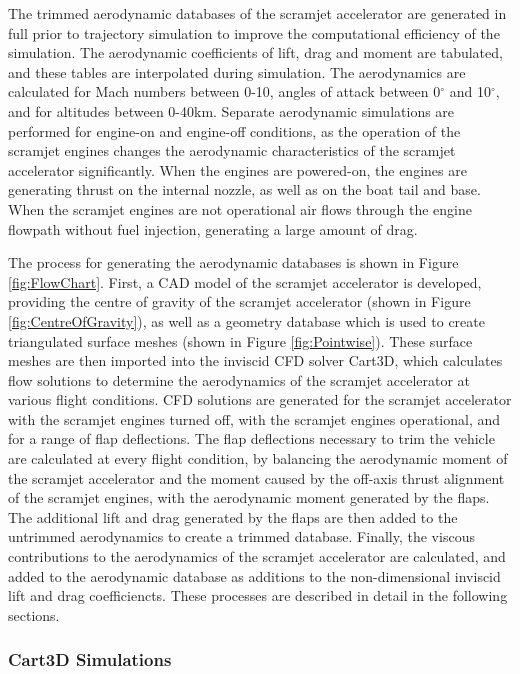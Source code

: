 The trimmed aerodynamic databases of the scramjet accelerator are generated in full prior to trajectory simulation to improve the computational efficiency of the simulation. The aerodynamic coefficients of lift, drag and moment are tabulated, and these tables are interpolated during simulation. 
The aerodynamics are calculated for Mach numbers between 0-10, angles of attack between 0$^\circ$ and 10$^\circ$, and for altitudes between 0-40km. Separate aerodynamic simulations are performed for engine-on and engine-off conditions, as the operation of the scramjet engines changes the aerodynamic characteristics of the scramjet accelerator significantly. When the engines are powered-on, the engines are generating thrust on the internal nozzle, as well as on the boat tail and base.  When the scramjet engines are not operational air flows through the engine flowpath without fuel injection, generating a large amount of drag. 


The process for generating the aerodynamic databases is shown in Figure \ref{fig:FlowChart}. First, a CAD model of the scramjet accelerator is developed, providing the centre of gravity of the scramjet accelerator (shown in Figure \ref{fig:CentreOfGravity}), as well as a geometry database which is used to create triangulated surface meshes (shown in Figure \ref{fig:Pointwise}). These surface meshes are then imported into the inviscid CFD solver Cart3D\cite{CART3D}, which calculates flow solutions to determine the aerodynamics of the scramjet accelerator at various flight conditions. CFD solutions are generated for the scramjet accelerator with the scramjet engines turned off, with the scramjet engines operational, and for a range of flap deflections. 
The flap deflections necessary to trim the vehicle are calculated at every flight condition, by balancing the aerodynamic moment of the scramjet accelerator and the moment caused by the off-axis thrust alignment of the scramjet engines, with the aerodynamic moment generated by the flaps. 
The additional lift and drag generated by the flaps are then added to the untrimmed aerodynamics to create a trimmed database.
Finally, the viscous contributions to the aerodynamics of the scramjet accelerator are calculated, and added to the aerodynamic database as additions to the non-dimensional inviscid lift and drag coefficiencts. These processes are described in detail in the following sections. 







\subsubsection{Cart3D Simulations}\label{sec:cart3d}


